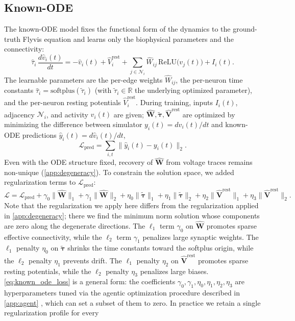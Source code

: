 \documentclass{article}
\begin{document}
\subsection{Known-ODE} \label{app:known_ode}
The known-ODE model fixes the functional form of the dynamics to the ground-truth Flyvis equation and learns only the biophysical parameters and the connectivity:
\begin{equation}
\hat{\tau}_i\,\frac{d\hat{v}_i(t)}{dt}
= -\hat{v}_i(t) + \hat{V}^{\mathrm{rest}}_i
+ \sum_{j\in\mathcal{N}_i} \hat{W}_{ij}\,\mathrm{ReLU}\!\big(v_j(t)\big)
+ I_i(t).
\label{eq:known_ode}
\end{equation}
The learnable parameters are the per-edge weights $\hat{W}_{ij}$, the per-neuron time constants $\hat{\tau}_i = \mathrm{softplus}(\tilde{\tau}_i)$ (with $\tilde{\tau}_i\in\mathbb{R}$ the underlying optimized parameter), and the per-neuron resting potentials $\hat{V}^{\mathrm{rest}}_i$. During training, inputs $I_i(t)$, adjacency $\mathcal{N}_i$, and activity $v_i(t)$ are given; $\hat{\mathbf{W}}, \tilde{\boldsymbol{\tau}}, \hat{\mathbf{V}}^{\mathrm{rest}}$ are optimized by minimizing the difference between simulator $y_i(t)=dv_i(t)/dt$ and known-ODE predictions $\hat{y}_i(t)=d\hat{v}_i(t)/dt$,
\begin{equation}
\mathcal{L}_{\mathrm{pred}} = \sum_{i,t}\|\hat{y}_i(t) - y_i(t)\|_2.
\label{eq:known_ode_loss_pred}
\end{equation}
Even with the ODE structure fixed, recovery of $\hat{\mathbf{W}}$ from voltage traces remains non-unique (\cref{app:degeneracy}). To constrain the solution space, we added regularization terms to $\mathcal{L}_{\mathrm{pred}}$:
\begin{equation}
\mathcal{L} = \mathcal{L}_{\mathrm{pred}}
+ \gamma_0\|\hat{\mathbf{W}}\|_1 + \gamma_1\|\hat{\mathbf{W}}\|_2
+ \eta_0\|\tilde{\boldsymbol{\tau}}\|_1 + \eta_1\|\tilde{\boldsymbol{\tau}}\|_2
+ \eta_2\|\hat{\mathbf{V}}^{\mathrm{rest}}\|_1 + \eta_3\|\hat{\mathbf{V}}^{\mathrm{rest}}\|_2.
\label{eq:known_ode_loss}
\end{equation}
Note that the regularization we apply here differs from the regularization applied in \cref{app:degeneracy}; 
there we find the minimum norm solution whose components are zero along the degenerate directions.
The $\ell_1$ term $\gamma_0$ on $\hat{\mathbf{W}}$ promotes sparse effective connectivity, while the $\ell_2$ term $\gamma_1$ penalizes large synaptic weights. The $\ell_1$ penalty $\eta_0$ on $\tilde{\boldsymbol{\tau}}$ shrinks the time constants toward the softplus origin, while the $\ell_2$ penalty $\eta_1$ prevents drift. The $\ell_1$ penalty $\eta_2$ on $\hat{\mathbf{V}}^{\mathrm{rest}}$ promotes sparse resting potentials, while the $\ell_2$ penalty $\eta_3$ penalizes large biases. \cref{eq:known_ode_loss} is a general form: the coefficients $\gamma_0,\gamma_1,\eta_0,\eta_1,\eta_2,\eta_3$ are hyperparameters tuned via the agentic optimization procedure described in \cref{app:agent} , which can set a subset of them to zero. In practice we retain a single regularization profile for every
\end{document}
